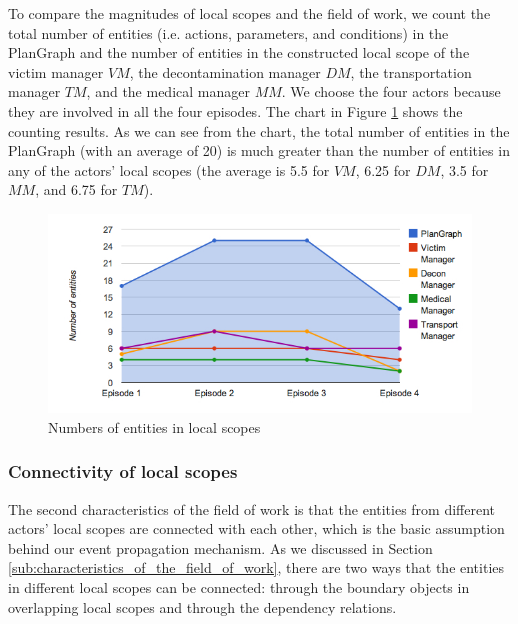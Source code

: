 To compare the magnitudes of local scopes and the field of work, we count the total number of entities (i.e. actions, parameters, and conditions) in the PlanGraph and the number of entities in the constructed local scope of the victim manager $VM$, the decontamination manager $DM$, the transportation manager $TM$, and the medical manager $MM$. We choose the four actors because they are involved in all the four episodes. The chart in Figure \ref{fig:partiality_of_local_scopes} shows the counting results. As we can see from the chart, the total number of entities in the PlanGraph (with an average of 20) is much greater than the number of entities in any of the actors' local scopes (the average is 5.5 for $VM$, 6.25 for $DM$, 3.5 for $MM$, and 6.75 for $TM$). 

\begin{figure}[htbp] %
	\centering
	\includegraphics[width=5.8in]{partiality_of_local_scopes.jpg} 
	\caption{Numbers of entities in local scopes}
	\label{fig:partiality_of_local_scopes}
\end{figure}


\subsubsection{Connectivity of local scopes} %
\label{ssub:connectivity_of_local_scopes}
The second characteristics of the field of work is that the entities from different actors' local scopes are connected with each other, which is the basic assumption behind our event propagation mechanism. As we discussed in Section \ref{sub:characteristics_of_the_field_of_work}, there are two ways that the entities in different local scopes can be connected: through the boundary objects in overlapping local scopes and through the dependency relations.

